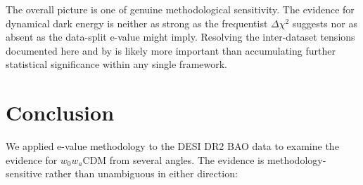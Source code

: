 \documentclass[11pt,a4paper]{article}
\begin{document}
The overall picture is one of genuine methodological sensitivity. The evidence for dynamical dark energy is neither as strong as the frequentist $\Delta\chi^2$ suggests nor as absent as the data-split e-value might imply. Resolving the inter-dataset tensions documented here and by \citet{WangMota2025} is likely more important than accumulating further statistical significance within any single framework.

\section{Conclusion}
\label{sec:conclusion}

We applied e-value methodology to the DESI DR2 BAO data to examine the evidence for $w_0w_a$CDM from several angles. The evidence is methodology-sensitive rather than unambiguous in either direction:
\end{document}
